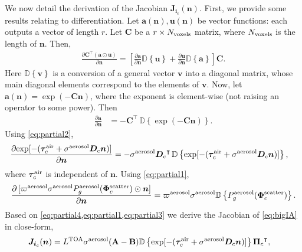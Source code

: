 \documentclass[10pt,letterpaper]{article}
\newcommand{\OpDistance}{\bm{D}}
\newcommand{\OpDiag}[1]{\mathbb{D}\left\{#1\right\}}
\newcommand{\abbrev}[1]{\rm{#1}}
\newcommand{\PartDeriv}[2]{\frac{\partial{#1}}{\partial{#2}}}
\newcommand{\vect}[1]{\bm{#1}}
\newcommand{\mat}[1]{\bm{#1}}
\newcommand{\transpose}[1]{{#1}^\intercal}
\begin{document}
We now detail the derivation of the Jacobian ${\bm J}_{{\bm i}_c}({\bm n})$. First, we provide some results relating to differentiation.  Let
$\vect{a}(\vect{n}),\vect{u}(\vect{n})$ be vector functions: each outputs a vector of
length $r$. Let $\mat{C}$ be a $r \times N_{\rm voxels}$ matrix, where $N_{\rm voxels}$ is the length of ${\bm n}$.
Then,
\begin{align}
  \label{eq:partial1}
  \PartDeriv{\transpose{\mat{C}} (\vect{a} \odot \vect{u})}{\vect{n}}
  = \left[ \PartDeriv{\vect{a}}{\vect{n}} \OpDiag{\vect{u}} +
    \PartDeriv{\vect{u}}{\vect{n}} \OpDiag{\vect{a}} \right] \mat{C}.
\end{align}
Here $\OpDiag{\vect{v}}$ is a conversion of a general vector $\vect{v}$
into a diagonal matrix, whose main diagonal elements correspond to the
elements of $\vect{v}$. Now, let
  $\vect{a}(\vect{n}) = \exp(-{\mat{C}}\vect{n})$,
where the exponent is element-wise (not raising an
operator to some power). Then
\begin{align}
  \label{eq:partial2}
  \PartDeriv{\vect{a}}{\vect{n}} &= - \transpose{\mat{C}} \,
  \OpDiag{\exp(-{\mat{C}}\vect{n})}.
\end{align}
Using \cref{eq:partial2},
\begin{align}
  \label{eq:partial4}
  \PartDeriv{\exp[-(\vect{\tau}_c^{\rm air} + {\sigma}^{\rm aerosol}{\bm D}_c {\bm n})]}
  {\vect{n}} &= - {\sigma}^{\rm aerosol}\transpose{\OpDistance_c} \,
  \OpDiag{\exp[-(\vect{\tau}_c^{\rm air} + {\sigma}^{\rm aerosol}{\bm D}_c {\bm n})]},
\end{align}
where $\vect{\tau}_c^{\rm air}$ is independent of ${\bm n}$. Using \cref{eq:partial1},
\begin{align}
  \label{eq:partial3}
  \PartDeriv{\, [\varpi^{\rm aerosol}\sigma^{\rm aerosol} P^{\rm
      aerosol}_g(\vect{\Phi}^{\rm scatter}_c) \odot{\bm n}]}{\vect{n}}
  =
  \varpi^{\rm aerosol}\sigma^{\rm aerosol}\OpDiag{P^{\rm
      aerosol}_g(\vect{\Phi}^{\rm scatter}_c)}.
\end{align}
Based on \cref{eq:partial4,eq:partial1,eq:partial3} we derive the Jacobian of \cref{eq:bigIA}
in close-form,
\begin{align}
  {\bm J}_{{\bm i}_c}({\bm n}) &= L^{\rm TOA}{\sigma}^{\rm aerosol}({\bf A}-{\bf B})
  \OpDiag{\exp[-(\vect{\tau}_c^{\rm air} + {\sigma}^{\rm
      aerosol} {\bm D}_c {\bm n})]} \transpose{{\vect{\Pi}}_c}
   ,
  \label{eq:gradient2}
\end{align}
\end{document}
